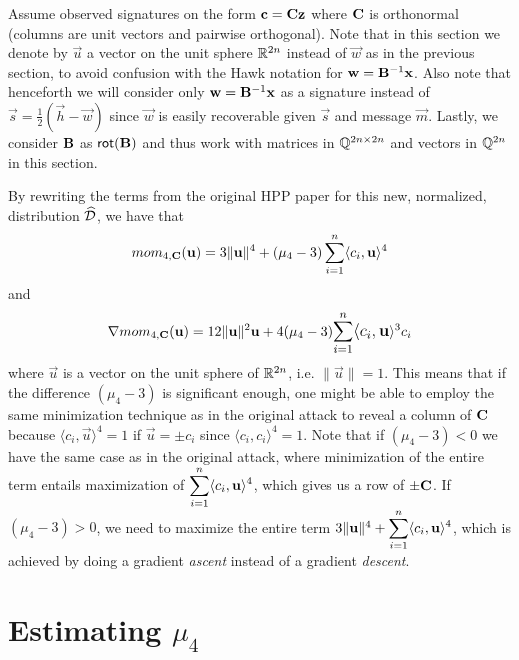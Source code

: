 Assume observed signatures on the form $\mathbf{c} = \mathbf{C} \mathbf{z}$ where $\mathbf{C}$ is orthonormal (columns are unit vectors and pairwise orthogonal). 
Note that in this section we denote by $\vec{u}$ a vector on the unit sphere $\mathbb{R}^{2n}$ instead of $\vec{w}$ as in the previous section, to avoid confusion with the Hawk notation for $\mathbf{w} = \mathbf{B}^{-1} \mathbf{x}$.
Also note that henceforth we will consider only $\mathbf{w} = \mathbf{B}^{-1} \mathbf{x}$ as a signature instead of $\vec{s} = \frac{1}{2}(\vec{h} - \vec{w})$ since $\vec{w}$ is easily recoverable given $\vec{s}$ and message $\vec{m}$.
Lastly, we consider $\mathbf{B}$ as $\mathsf{rot}(\mathbf{B})$ and thus work with matrices in $\mathbb{Q}^{2n \times 2n}$ and vectors in $\mathbb{Q}^{2n}$ in this section. 

By rewriting the terms from the original HPP paper \cite{NR09} for this new, normalized, distribution $\widehat{\mathcal{D}}$, we have that
\[mom_{4, \mathbf{C}} (\mathbf{u}) = 3 \lVert \mathbf{u} \rVert ^4 + (\mu_4 - 3) \sum_{i=1}^{n} \langle c_i, \mathbf{u} \rangle^4 \]
and
\[\nabla mom_{4, \mat{C}} (\vec{u}) = 12 \lVert \vec{u} \rVert^2 \vec{u} + 4(\mu_4 - 3) \mathlarger{\sum_{i=1}^{n} \langle c_i, \vec{u}} \rangle^3 c_i\]
where $\vec{u}$ is a vector on the unit sphere of $\mathbb{R}^{2n}$, i.e. $\lVert \vec{u} \rVert = 1$. 
This means that if the difference $(\mu_4 - 3)$ is significant enough, one might be able to employ the same minimization technique as in the original attack to reveal a column of $\mathbf{C}$ 
because $\langle c_i, \vec{u} \rangle^4 = 1$ if $\vec{u} = \pm c_i$ since $\langle c_i, c_i \rangle^4 = 1$.
Note that if $(\mu_4 - 3) < 0$ we have the same case as in the original attack, where minimization of the entire term entails maximization of $\mathlarger{\sum_{i=1}^{n} \langle c_i, \vec{u} \rangle^4}$, which gives us a row of $\pm \mathbf{C}$.
If $(\mu_4 - 3) > 0$, we need to maximize the entire term $3 \lVert \vec{u} \rVert ^4 + \mathlarger{\sum_{i=1}^{n} \langle c_i, \vec{u} \rangle^4}$, which is achieved by doing a gradient \textit{ascent} instead of a gradient \textit{descent}.

\section{Estimating $\mu_4$}


